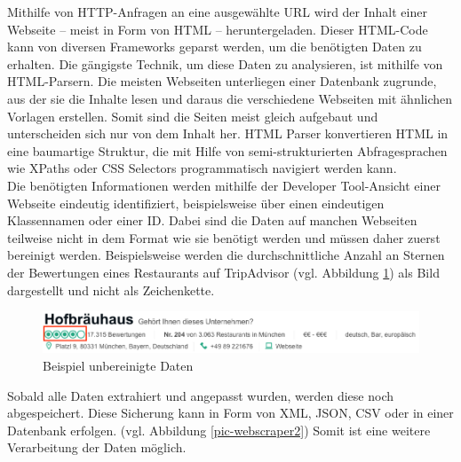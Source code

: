 \documentclass[a4paper,oneside,12pt]{report}
\begin{document}
				Mithilfe von HTTP-Anfragen an eine ausgewählte URL wird der Inhalt einer Webseite – meist in Form von HTML – heruntergeladen. Dieser HTML-Code kann von diversen Frameworks geparst werden, um die benötigten Daten zu erhalten. Die gängigste Technik, um diese Daten zu analysieren, ist mithilfe von HTML-Parsern. Die meisten Webseiten unterliegen einer Datenbank zugrunde, aus der sie die Inhalte lesen und daraus die verschiedene Webseiten mit ähnlichen Vorlagen erstellen. Somit sind die Seiten meist gleich aufgebaut und unterscheiden sich nur von dem Inhalt her. HTML Parser konvertieren HTML in eine baumartige Struktur, die mit Hilfe von semi-strukturierten Abfragesprachen wie XPaths oder CSS Selectors programmatisch navigiert werden kann. \cite{bib-anzSterne}
				\\
				Die benötigten Informationen werden mithilfe der Developer Tool-Ansicht einer Webseite eindeutig identifiziert, beispielsweise über einen eindeutigen Klassennamen oder einer ID. Dabei sind die Daten auf manchen Webseiten teilweise nicht in dem Format wie sie benötigt werden und müssen daher zuerst bereinigt werden. Beispielsweise werden die durchschnittliche Anzahl an Sternen der Bewertungen eines Restaurants auf TripAdvisor (vgl. Abbildung \ref{pic-anzSterne}) als Bild dargestellt und nicht als Zeichenkette. \cite{bib-anzSterne}
				
				\begin{figure}[H]
					\centering
					\begin{minipage}[b]{0.9\textwidth}
						\includegraphics[width=\textwidth]{Bilder/BeispielAnzahlSterne.png}
					\end{minipage}
					\centering
					\caption[Beispiel unbereinigte Daten]{Beispiel unbereinigte Daten}
					\label{pic-anzSterne}
				\end{figure}
				
				Sobald alle Daten extrahiert und angepasst wurden, werden diese noch abgespeichert. Diese Sicherung kann in Form von XML, JSON, CSV oder in einer Datenbank erfolgen. (vgl. Abbildung \ref{pic-webscraper2}) Somit ist eine weitere Verarbeitung der Daten möglich. \cite{bib-anzSterne}
				
\end{document}
